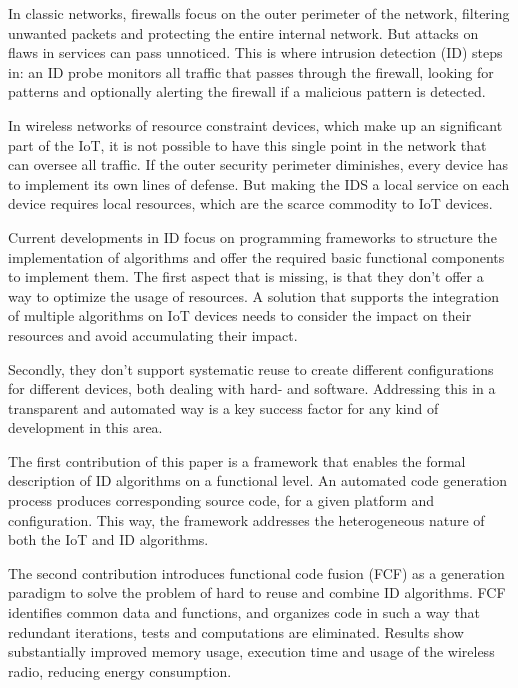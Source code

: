 \documentclass[conference]{IEEEtran}
\begin{document}

In classic networks, firewalls focus on the outer perimeter of the network,
filtering unwanted packets and protecting the entire internal network. But
attacks on flaws in services can pass unnoticed. This is where intrusion
detection (ID) steps in: an ID probe monitors all traffic that passes through
the firewall, looking for patterns and optionally alerting the firewall if a
malicious pattern is detected\cite{denning1987intrusion}.


In wireless networks of resource constraint devices, which make up an
significant part of the IoT, it is not possible to have this single point in
the network that can oversee all traffic\cite{mishra2004intrusion}. If the
outer security perimeter diminishes, every device has to implement its own
lines of defense. But making the IDS a local service on each device requires
local resources, which are the scarce commodity to IoT devices.


Current developments in ID focus on programming frameworks to structure the
implementation of algorithms\cite{valero2012di} and offer the required basic
functional components to implement them\cite{krontiris2008lidea}. The first
aspect that is missing, is that they don't offer a way to optimize the usage of
resources. A solution that supports the integration of multiple algorithms on
IoT devices needs to consider the impact on their resources and avoid
accumulating their impact.

Secondly, they don't support systematic reuse to create different
configurations for different devices, both dealing with hard- and software.
Addressing this in a transparent and automated way is a key success factor for
any kind of development in this area.



The first contribution of this paper is a framework that enables the formal
description of ID algorithms on a functional level. An automated code
generation process produces corresponding source code, for a given platform and
configuration. This way, the framework addresses the heterogeneous nature of
both the IoT and ID algorithms.


The second contribution introduces functional code fusion (FCF) as a generation
paradigm to solve the problem of hard to reuse and combine ID algorithms. FCF
identifies common data and functions, and organizes code in such a way that
redundant iterations, tests and computations are eliminated. Results show
substantially improved memory usage, execution time and usage of the wireless
radio, reducing energy consumption.
\end{document}
